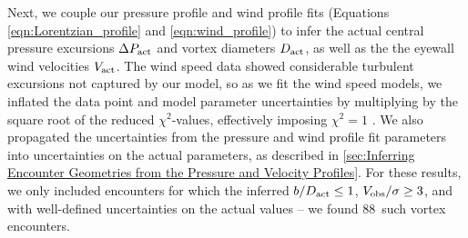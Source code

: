 \documentclass{aastex63}
\newcommand{\boverDactltone}{88}
\begin{document}


Next, we couple our pressure profile and wind profile fits (Equations \ref{eqn:Lorentzian_profile} and \ref{eqn:wind_profile}) to infer the actual central pressure excursions $\Delta P_{\rm act}$ and vortex diameters $D_{\rm act}$, as well as the the eyewall wind velocities $V_{\rm act}$. The wind speed data showed considerable turbulent excursions not captured by our model, so as we fit the wind speed models, we inflated the data point and model parameter uncertainties by multiplying by the square root of the reduced $\chi^2$-values, effectively imposing $\chi^2 = 1$ \citep[cf.][]{Press2007}. We also propagated the uncertainties from the pressure and wind profile fit parameters into uncertainties on the actual parameters, as described in \ref{sec:Inferring Encounter Geometries from the Pressure and Velocity Profiles}. For these results, we only included encounters for which the inferred $b/D_{\rm act} \leq 1$, $V_{\rm obs}/\sigma \geq 3$, and with well-defined uncertainties on the actual values -- we found \boverDactltone\ such vortex encounters. 
\end{document}
